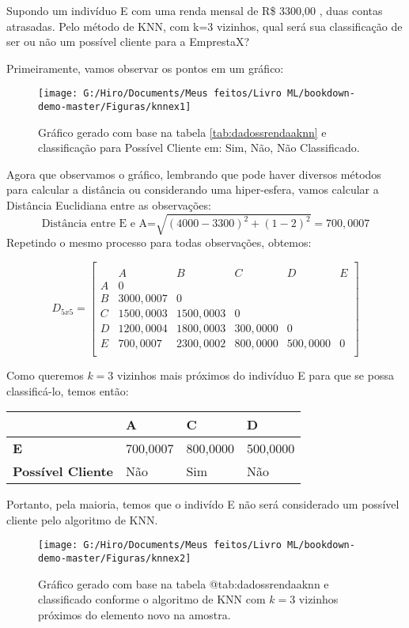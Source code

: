 \documentclass[
]{book}
\begin{document}
Supondo um indivíduo E com uma renda mensal de R\$ 3300,00 , duas contas atrasadas. Pelo método de KNN, com k=3 vizinhos, qual será sua classificação de ser ou não um possível cliente para a EmprestaX?

Primeiramente, vamos observar os pontos em um gráfico:

\begin{figure}

{\centering \texttt{[image: G:/Hiro/Documents/Meus feitos/Livro ML/bookdown-demo-master/Figuras/knnex1]} 

}

\caption{Gráfico gerado com base na tabela \ref{tab:dadossrendaaknn} e classificação para Possível Cliente em: Sim, Não, Não Classificado.}\label{fig:knnex1}
\end{figure}



Agora que observamos o gráfico, lembrando que pode haver diversos métodos para calcular a distância ou considerando uma hiper-esfera, vamos calcular a Distância Euclidiana entre as observações:
\[\mbox{Distância entre E e A=}\sqrt{(4000-3300)^2+(1-2)^2}=700,0007\]
Repetindo o mesmo processo para todas observações, obtemos:

\[D_{5x5}=\begin{bmatrix}\\
 &A&B&C&D&E \\
 A&0&&&&\\
 B&3000,0007&0&&&\\
 C & 1500,0003& 1500,0003&0&&\\
 D& 1200,0004& 1800,0003& 300,0000&0&\\
 E& 700,0007& 2300,0002& 800,0000& 500,0000&0\\
\end{bmatrix}\]

Como queremos \(k=3\) vizinhos mais próximos do indivíduo E para que se possa classificá-lo, temos então:

\begin{longtable}[]{@{}llll@{}}
\toprule
& \textbf{A} & \textbf{C} & \textbf{D}\tabularnewline
\midrule
\endhead
\textbf{E} & 700,0007 & 800,0000 & 500,0000\tabularnewline
\textbf{Possível Cliente} & Não & Sim & Não\tabularnewline
\bottomrule
\end{longtable}

Portanto, pela maioria, temos que o indivído E não será considerado um possível cliente pelo algoritmo de KNN.

\begin{figure}

{\centering \texttt{[image: G:/Hiro/Documents/Meus feitos/Livro ML/bookdown-demo-master/Figuras/knnex2]} 

}

\caption{Gráfico gerado com base na tabela @tab:dadossrendaaknn e classificado conforme o algoritmo de KNN com \(k=3\) vizinhos próximos do elemento novo na amostra.}\label{fig:knnex2}
\end{figure}
\end{document}
